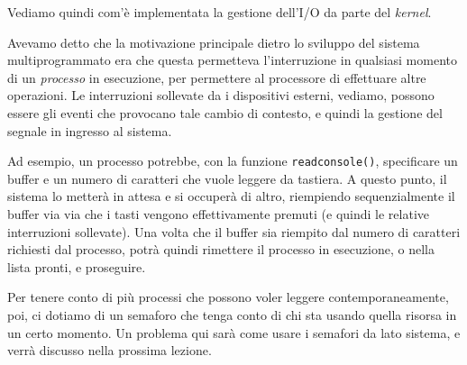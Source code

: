 \documentclass[a4paper,11pt]{article}
\begin{document}
Vediamo quindi com'è implementata la gestione dell'I/O da parte del \textit{kernel}.

Avevamo detto che la motivazione principale dietro lo sviluppo del sistema multiprogrammato era che questa permetteva l'interruzione in qualsiasi momento di un \textit{processo} in esecuzione, per permettere al processore di effettuare altre operazioni.
Le interruzioni sollevate da i dispositivi esterni, vediamo, possono essere gli eventi che provocano tale cambio di contesto, e quindi la gestione del segnale in ingresso al sistema.

Ad esempio, un processo potrebbe, con la funzione \lstinline|readconsole()|, specificare un buffer e un numero di caratteri che vuole leggere da tastiera.
A questo punto, il sistema lo metterà in attesa e si occuperà di altro, riempiendo sequenzialmente il buffer via via che i tasti vengono effettivamente premuti (e quindi le relative interruzioni sollevate).
Una volta che il buffer sia riempito dal numero di caratteri richiesti dal processo, potrà quindi rimettere il processo in esecuzione, o nella lista pronti, e proseguire.

Per tenere conto di più processi che possono voler leggere contemporaneamente, poi, ci dotiamo di un semaforo che tenga conto di chi sta usando quella risorsa in un certo momento.
Un problema qui sarà come usare i semafori da lato sistema, e verrà discusso nella prossima lezione.
\end{document}
